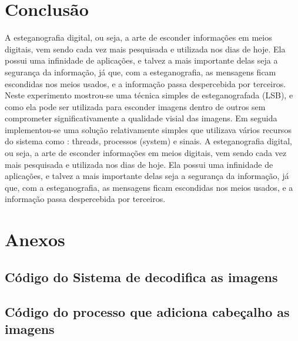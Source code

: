 \documentclass{ieee}
\begin{document}
\section{Conclusão}
A esteganografia digital, ou seja, a arte de esconder
informações em meios digitais, vem sendo cada vez mais pesquisada e utilizada nos dias de hoje. Ela possui uma infinidade de aplicações,
e talvez a mais importante delas seja a segurança da informação, já que, com a esteganografia, as mensagens ficam escondidas nos meios usados,
e a informação passa despercebida por terceiros.
Neste experimento mostrou-se uma técnica simples de esteganografada (LSB), e como ela pode ser utilizada para esconder imagens  dentro de outros
sem comprometer significativamente a qualidade visial das imagens. Em seguida implementou-se uma solução relativamente simples que 
utilizava vários recursos do sistema como : threads, processos (system) e sinais. A esteganografia digital, ou seja, a arte de esconder
informações em meios digitais, vem sendo cada vez mais pesquisada e utilizada nos dias de hoje. Ela possui uma infinidade de aplicações,
e talvez a mais importante delas seja a segurança da informação, já que, com a esteganografia, as mensagens ficam escondidas nos meios usados,
e a informação passa despercebida por terceiros.
\nocite{ex1,ex2}



\onecolumn
\newpage
\newpage
\section{Anexos}
\subsection{Código do Sistema de decodifica as imagens}

\subsection{Código do processo que adiciona cabeçalho as imagens}

\end{document}
